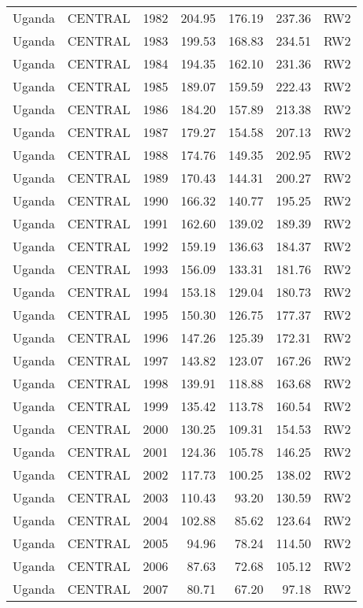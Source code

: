 \begin{longtable}{lllrrrl}
  Uganda & CENTRAL & 1982 & 204.95 & 176.19 & 237.36 & RW2 \\ 
  Uganda & CENTRAL & 1983 & 199.53 & 168.83 & 234.51 & RW2 \\ 
  Uganda & CENTRAL & 1984 & 194.35 & 162.10 & 231.36 & RW2 \\ 
  Uganda & CENTRAL & 1985 & 189.07 & 159.59 & 222.43 & RW2 \\ 
  Uganda & CENTRAL & 1986 & 184.20 & 157.89 & 213.38 & RW2 \\ 
  Uganda & CENTRAL & 1987 & 179.27 & 154.58 & 207.13 & RW2 \\ 
  Uganda & CENTRAL & 1988 & 174.76 & 149.35 & 202.95 & RW2 \\ 
  Uganda & CENTRAL & 1989 & 170.43 & 144.31 & 200.27 & RW2 \\ 
  Uganda & CENTRAL & 1990 & 166.32 & 140.77 & 195.25 & RW2 \\ 
  Uganda & CENTRAL & 1991 & 162.60 & 139.02 & 189.39 & RW2 \\ 
  Uganda & CENTRAL & 1992 & 159.19 & 136.63 & 184.37 & RW2 \\ 
  Uganda & CENTRAL & 1993 & 156.09 & 133.31 & 181.76 & RW2 \\ 
  Uganda & CENTRAL & 1994 & 153.18 & 129.04 & 180.73 & RW2 \\ 
  Uganda & CENTRAL & 1995 & 150.30 & 126.75 & 177.37 & RW2 \\ 
  Uganda & CENTRAL & 1996 & 147.26 & 125.39 & 172.31 & RW2 \\ 
  Uganda & CENTRAL & 1997 & 143.82 & 123.07 & 167.26 & RW2 \\ 
  Uganda & CENTRAL & 1998 & 139.91 & 118.88 & 163.68 & RW2 \\ 
  Uganda & CENTRAL & 1999 & 135.42 & 113.78 & 160.54 & RW2 \\ 
  Uganda & CENTRAL & 2000 & 130.25 & 109.31 & 154.53 & RW2 \\ 
  Uganda & CENTRAL & 2001 & 124.36 & 105.78 & 146.25 & RW2 \\ 
  Uganda & CENTRAL & 2002 & 117.73 & 100.25 & 138.02 & RW2 \\ 
  Uganda & CENTRAL & 2003 & 110.43 & 93.20 & 130.59 & RW2 \\ 
  Uganda & CENTRAL & 2004 & 102.88 & 85.62 & 123.64 & RW2 \\ 
  Uganda & CENTRAL & 2005 & 94.96 & 78.24 & 114.50 & RW2 \\ 
  Uganda & CENTRAL & 2006 & 87.63 & 72.68 & 105.12 & RW2 \\ 
  Uganda & CENTRAL & 2007 & 80.71 & 67.20 & 97.18 & RW2 \\ 

\end{longtable}
